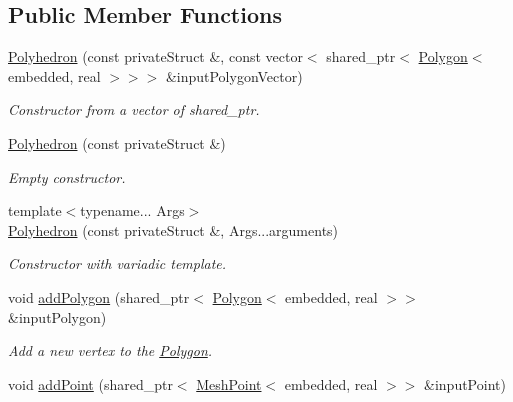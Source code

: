 \subsection*{Public Member Functions}
\begin{DoxyCompactItemize}
\item 
\hyperlink{class_polyhedron_ae7091aa1c81e60e701528ed4803f9d20}{Polyhedron} (const private\+Struct \&, const vector$<$ shared\+\_\+ptr$<$ \hyperlink{class_polygon}{Polygon}$<$ embedded, real $>$$>$$>$ \&input\+Polygon\+Vector)
\begin{DoxyCompactList}\small\item\em Constructor from a vector of shared\+\_\+ptr. \end{DoxyCompactList}\item 
\hyperlink{class_polyhedron_a43f9a7fdfcf838c4aa07d95bb3717b51}{Polyhedron} (const private\+Struct \&)
\begin{DoxyCompactList}\small\item\em Empty constructor. \end{DoxyCompactList}\item 
{\footnotesize template$<$typename... Args$>$ }\\\hyperlink{class_polyhedron_a31d0c019cb8aeb7c74d58aa39f91e2f6}{Polyhedron} (const private\+Struct \&, Args...\+arguments)
\begin{DoxyCompactList}\small\item\em Constructor with variadic template. \end{DoxyCompactList}\item 
void \hyperlink{class_polyhedron_a02b8869089bf78342875a197b6995901}{add\+Polygon} (shared\+\_\+ptr$<$ \hyperlink{class_polygon}{Polygon}$<$ embedded, real $>$$>$ \&input\+Polygon)\hypertarget{class_polyhedron_a02b8869089bf78342875a197b6995901}{}\label{class_polyhedron_a02b8869089bf78342875a197b6995901}

\begin{DoxyCompactList}\small\item\em Add a new vertex to the \hyperlink{class_polygon}{Polygon}. \end{DoxyCompactList}\item 
void \hyperlink{class_polyhedron_ad0b79656e93dcd92149f0f3ad53d54e4}{add\+Point} (shared\+\_\+ptr$<$ \hyperlink{class_mesh_point}{Mesh\+Point}$<$ embedded, real $>$$>$ \&input\+Point)\hypertarget{class_polyhedron_ad0b79656e93dcd92149f0f3ad53d54e4}{}\label{class_polyhedron_ad0b79656e93dcd92149f0f3ad53d54e4}


\end{DoxyCompactItemize}
